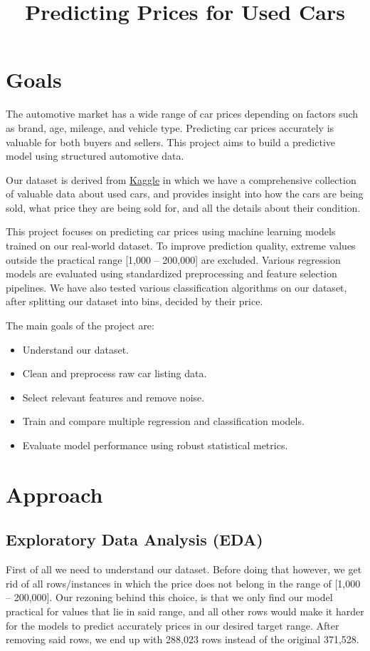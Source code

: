\documentclass[conference]{IEEEtran}
\title{Predicting Prices for Used Cars}
\author{
    \IEEEauthorblockN{Julios Fotiou}
    \IEEEauthorblockN{Andreas Hadjoullis}
    \IEEEauthorblockA{
        Computer Science \\
        University of Cyprus \\
    }
}
\begin{document}
\maketitle

\section{Goals}
The automotive market has a wide range of car prices depending on factors such
as brand, age, mileage, and vehicle type. Predicting car prices accurately is
valuable for both buyers and sellers. This project aims to build a predictive
model using structured automotive data.

Our dataset is derived from
\href{https://www.kaggle.com/datasets/thedevastator/uncovering-factors-that-affect-used-car-prices/data}{Kaggle}
in which we have a comprehensive collection of valuable data about used cars,
and provides insight into how the cars are being sold, what price they are
being sold for, and all the details about their condition.

This project focuses on predicting car prices using machine learning models
trained on our real-world dataset. To improve prediction quality, extreme
values outside the practical range [1,000 – 200,000] are excluded. Various
regression models are evaluated using standardized preprocessing and feature
selection pipelines. We have also tested various classification algorithms on
our dataset, after splitting our dataset into bins, decided by their price.

The main goals of the project are:
\begin{itemize}
    \item Understand our dataset.
    \item Clean and preprocess raw car listing data.
    \item Select relevant features and remove noise.
    \item Train and compare multiple regression and classification models.
    \item Evaluate model performance using robust statistical metrics.
\end{itemize}

\section{Approach}
\subsection{Exploratory Data Analysis (EDA)}
First of all we need to understand our dataset. Before doing that however, we
get rid of all rows/instances in which the price does not belong in the range
of [1,000 – 200,000]. Our rezoning behind this choice, is that we only find our
model practical for values that lie in said range, and all other rows would
make it harder for the models to predict accurately prices in our desired
target range. After removing said rows, we end up with 288,023 rows instead of
the original 371,528.
\end{document}

